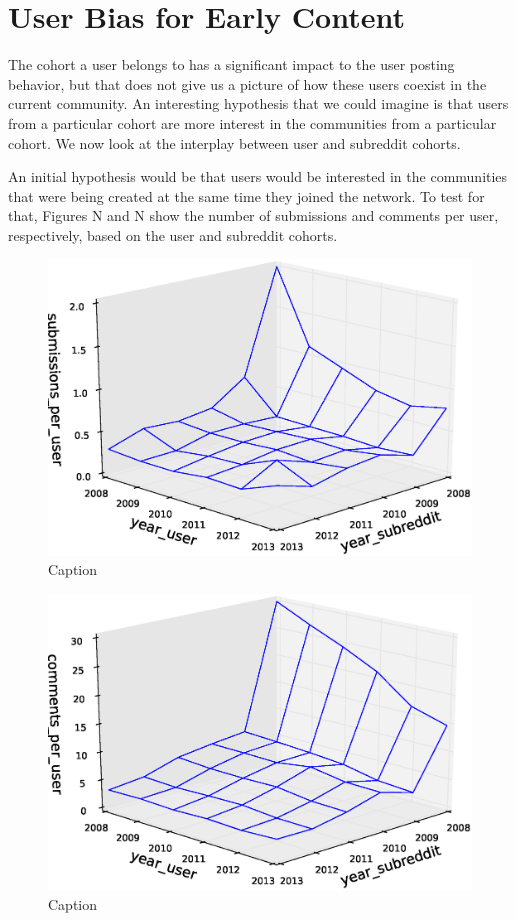 \section{User Bias for Early Content}

The cohort a user belongs to has a significant impact to the user posting behavior, but that does not give us a picture of how these users coexist in the current community. An interesting hypothesis that we could imagine is that users from a particular cohort are more interest in the communities from a particular cohort. We now look at the interplay between user and subreddit cohorts. 

An initial hypothesis would be that users would be interested in the communities that were being created at the same time they joined the network. To test for that, Figures N and N show the number of submissions and comments per user, respectively, based on the user and subreddit cohorts.

\begin{figure}[!tb]
\centering
\includegraphics[scale=0.4]{./images/user_subreddit_submissions_cohorts.eps}
\caption{Caption}
\label{fig:user_subreddit_submissions_cohorts}
\end{figure}

\begin{figure}[!tb]
\centering
\includegraphics[scale=0.4]{./images/user_subreddit_comments_cohorts.eps}
\caption{Caption}
\label{fig:user_subreddit_comments_cohorts}
\end{figure}

